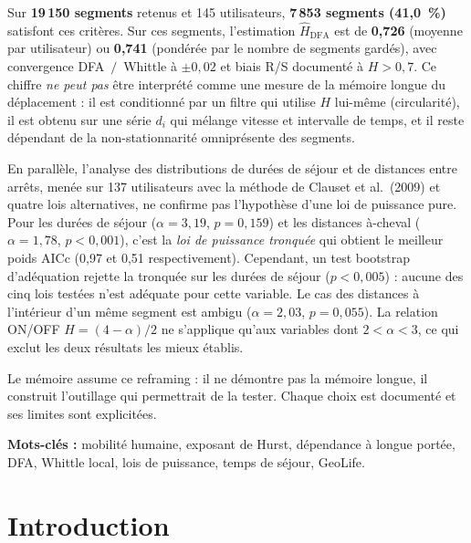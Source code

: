 \documentclass[12pt,a4paper]{report}
\theoremstyle{definition}
\begin{document}
Sur \textbf{19\,150 segments} retenus et 145 utilisateurs, \textbf{7\,853 segments
(41,0~\%)} satisfont ces critères. Sur ces segments, l'estimation
$\hat H_{\mathrm{DFA}}$ est de \textbf{0,726} (moyenne par utilisateur) ou \textbf{0,741}
(pondérée par le nombre de segments gardés), avec convergence DFA~$/$~Whittle à
$\pm 0{,}02$ et biais R/S documenté à $H > 0{,}7$. Ce chiffre \emph{ne peut pas} être
interprété comme une mesure de la mémoire longue du déplacement : il est conditionné par
un filtre qui utilise $H$ lui-même (circularité), il est obtenu sur une série $d_i$ qui
mélange vitesse et intervalle de temps, et il reste dépendant de la non-stationnarité
omniprésente des segments.

En parallèle, l'analyse des distributions de durées de séjour et de distances entre
arrêts, menée sur 137 utilisateurs avec la méthode de Clauset et al.\ (2009) et quatre
lois alternatives, ne confirme pas l'hypothèse d'une loi de puissance pure. Pour les
durées de séjour ($\alpha=3{,}19$, $p=0{,}159$) et les distances à-cheval
($\alpha=1{,}78$, $p<0{,}001$), c'est la \emph{loi de puissance tronquée} qui obtient le
meilleur poids AICc (0{,}97 et 0{,}51 respectivement). Cependant, un test bootstrap
d'adéquation rejette la tronquée sur les durées de séjour ($p<0{,}005$) : aucune des cinq
lois testées n'est adéquate pour cette variable. Le cas des distances à l'intérieur d'un
même segment est ambigu ($\alpha=2{,}03$, $p=0{,}055$). La relation ON/OFF
$H=(4-\alpha)/2$ ne s'applique qu'aux variables dont $2<\alpha<3$, ce qui exclut les deux
résultats les mieux établis.

Le mémoire assume ce reframing : il ne démontre pas la mémoire longue, il construit
l'outillage qui permettrait de la tester. Chaque choix est documenté et ses limites sont
explicitées.

\medskip
\noindent\textbf{Mots-clés :} mobilité humaine, exposant de Hurst, dépendance à longue
portée, DFA, Whittle local, lois de puissance, temps de séjour, GeoLife.

\tableofcontents
\listoftables
\listoffigures

\clearpage
{}

\chapter{Introduction}
\label{ch:intro}
\end{document}
